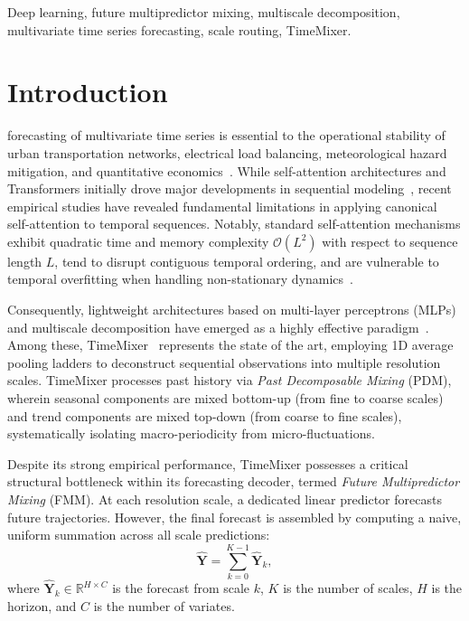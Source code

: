 \documentclass[journal]{IEEEtran}
\begin{document}
\begin{IEEEkeywords}
Deep learning, future multipredictor mixing, multiscale decomposition, multivariate time series forecasting, scale routing, TimeMixer.
\end{IEEEkeywords}

\IEEEpeerreviewmaketitle

\section{Introduction}
 forecasting of multivariate time series is essential to the operational stability of urban transportation networks, electrical load balancing, meteorological hazard mitigation, and quantitative economics~\cite{zhou2021informer,wu2021autoformer}. While self-attention architectures and Transformers initially drove major developments in sequential modeling~\cite{vaswani2017attention,zhou2022fedformer,nie2023patchtst}, recent empirical studies have revealed fundamental limitations in applying canonical self-attention to temporal sequences. Notably, standard self-attention mechanisms exhibit quadratic time and memory complexity $\mathcal{O}(L^2)$ with respect to sequence length $L$, tend to disrupt contiguous temporal ordering, and are vulnerable to temporal overfitting when handling non-stationary dynamics~\cite{zeng2023dlinear}.

Consequently, lightweight architectures based on multi-layer perceptrons (MLPs) and multiscale decomposition have emerged as a highly effective paradigm~\cite{oreshkin2019nbeats,challu2023nhits,wu2023timesnet,liu2022scinet}. Among these, TimeMixer~\cite{wang2024timemixer} represents the state of the art, employing 1D average pooling ladders to deconstruct sequential observations into multiple resolution scales. TimeMixer processes past history via \textit{Past Decomposable Mixing} (PDM), wherein seasonal components are mixed bottom-up (from fine to coarse scales) and trend components are mixed top-down (from coarse to fine scales), systematically isolating macro-periodicity from micro-fluctuations.

Despite its strong empirical performance, TimeMixer possesses a critical structural bottleneck within its forecasting decoder, termed \textit{Future Multipredictor Mixing} (FMM). At each resolution scale, a dedicated linear predictor forecasts future trajectories. However, the final forecast is assembled by computing a naive, uniform summation across all scale predictions:
\begin{equation}
\hat{\mathbf{Y}} = \sum_{k=0}^{K-1} \hat{\mathbf{Y}}_k ,
\label{eq:baseline_sum}
\end{equation}
where $\hat{\mathbf{Y}}_k \in \mathbb{R}^{H \times C}$ is the forecast from scale $k$, $K$ is the number of scales, $H$ is the horizon, and $C$ is the number of variates.
\end{document}
